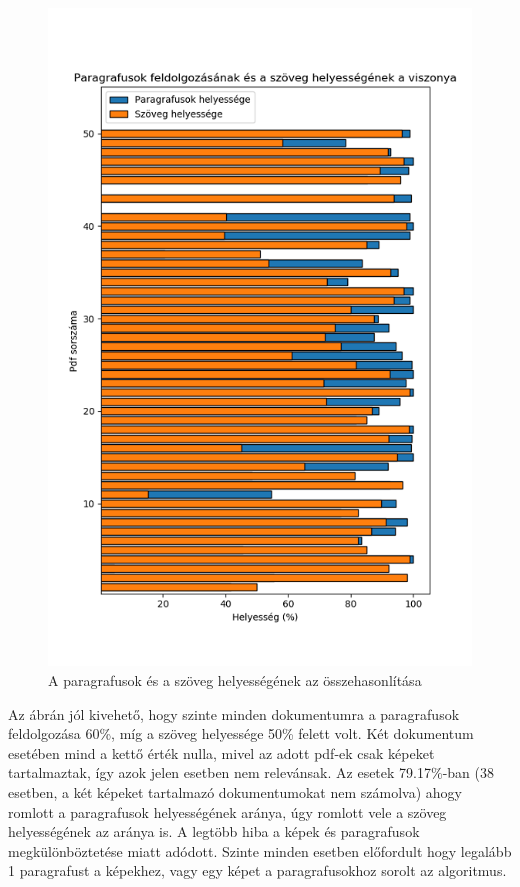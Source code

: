 \begin{figure}[H]
\centering
\includegraphics[scale=1]{images/paragraph_and_text.png}
\caption{A paragrafusok és a szöveg helyességének az összehasonlítása}
\label{fig:paragraph and text}
\end{figure}

Az ábrán jól kivehető, hogy szinte minden dokumentumra a paragrafusok feldolgozása 60\%, míg a szöveg helyessége 50\% felett volt. Két dokumentum esetében mind a kettő érték nulla, mivel az adott pdf-ek csak képeket tartalmaztak, így azok jelen esetben nem relevánsak. Az esetek 79.17\%-ban (38 esetben, a két képeket tartalmazó dokumentumokat nem számolva) ahogy romlott a paragrafusok helyességének aránya, úgy romlott vele a szöveg helyességének az aránya is. A legtöbb hiba a képek és paragrafusok megkülönböztetése miatt adódott. Szinte minden esetben előfordult hogy legalább 1 paragrafust a képekhez, vagy egy képet a paragrafusokhoz sorolt az algoritmus.  